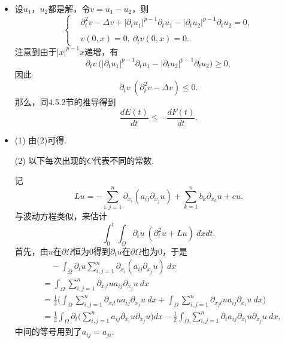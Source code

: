 \begin{itemize}
\item[7.] 设$u_1$，$u_2$都是解，令$v=u_1-u_2$，则
\begin{equation*}
    \left\{\begin{aligned}
        &\partial^2_t v-\Delta v+|\partial_t u_1|^{p-1}\partial_t u_1
        -|\partial_t u_2|^{p-1}\partial_t u_2=0,\\ \\
        &v(0,x)=0,\ \partial_t v(0,x)=0.
        \end{aligned}\right.
\end{equation*}
注意到由于$|x|^{p-1}x$递增，有
$$\partial_t v\>\big(|\partial_t u_1|^{p-1}\partial_t u_1
-|\partial_t u_2|^{p-1}\partial_t u_2\big)\geqslant0,$$
因此$$\partial_t v\>(\partial^2_t v-\Delta v)\leqslant0.$$
那么，同4.5.2节的推导得到
$$\frac{dE(t)}{dt}\leqslant-\frac{dF(t)}{dt}.$$

\item[8.] (1) 由(2)可得.

(2) 以下每次出现的$C$代表不同的常数.

记$$Lu=-\sum_{i,j=1}^n\partial_{x_i}(a_{ij}\partial_{x_j}u)
+\sum_{k=1}^nb_k\partial_{x_k}u+cu.$$
与波动方程类似，来估计
$$\int_0^t\int_\varOmega\partial_tu\>(\partial^2_tu+Lu)\>dxdt.$$
首先，由$u$在$\partial\varOmega$恒为$0$得到$\partial_tu$在$\partial\varOmega$也为$0$，于是
\begin{align*}
    &\quad-\int_\varOmega\partial_tu\sum_{i,j=1}^n\partial_{x_i}(a_{ij}\partial_{x_j}u)\>dx\\
    &=\int_\varOmega\sum_{i,j=1}^n\partial_{x_it}ua_{ij}\partial_{x_j}u\>dx\\
    &=\frac{1}{2}\bigg(\int_\varOmega\sum_{i,j=1}^n\partial_{x_it}ua_{ij}\partial_{x_j}u\>dx
    +\int_\varOmega\sum_{i,j=1}^n\partial_{x_jt}ua_{ij}\partial_{x_i}u\>dx\bigg)\\
    &=\frac{1}{2}\int_\varOmega\partial_t\bigg(\sum_{i,j=1}^na_{ij}\partial_{x_i}u\partial_{x_j}u\bigg)dx
    -\frac{1}{2}\int_\varOmega\sum_{i,j=1}^n\partial_ta_{ij}\partial_{x_i}u\partial_{x_j}u\>dx,
\end{align*}
中间的等号用到了$a_{ij}=a_{ji}$.


\end{itemize}
